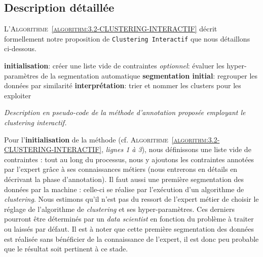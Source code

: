 	
	\subsection{Description détaillée}
	\label{section:3.2.2-DESCRIPTION-THEORIQUE-DETAILLEE}
	
		L'\textsc{Algorithme~\ref{algorithm:3.2-CLUSTERING-INTERACTIF}} décrit formellement notre proposition de \texttt{Clustering Interactif} que nous détaillons ci-dessous.
		\begin{algorithm}
			\textbf{initialisation}: créer une liste vide de contraintes \;
			\textit{optionnel}: évaluer les hyper-paramètres de la segmentation automatique \;
			\textbf{segmentation initial}: regrouper les données par similarité \;
			\textbf{interprétation}: trier et nommer les clusters pour les exploiter \;
			\caption{\textit{
				Description en pseudo-code de la méthode d'annotation proposée employant le \textit{clustering} interactif.
			}}
			\label{algorithm:3.2-CLUSTERING-INTERACTIF}
		\end{algorithm}
		
		Pour l'\textbf{initialisation} de la méthode (cf. \textsc{Algorithme~\ref{algorithm:3.2-CLUSTERING-INTERACTIF}}, \textit{lignes 1 à 3}), nous définissons une liste vide de contraintes : tout au long du processus, nous y ajoutons les contraintes annotées par l'expert grâce à ses connaissances métiers (nous entrerons en détails en décrivant la phase d'annotation).
		Il faut aussi une première segmentation des données par la machine : celle-ci se réalise par l'exécution d'un algorithme de \textit{clustering}.
		Nous estimons qu'il n'est pas du ressort de l'expert métier de choisir le réglage de l'algorithme de \textit{clustering} et ses hyper-paramètres.
		Ces derniers pourront être déterminés par un \textit{data scientist} en fonction du problème à traiter ou laissés par défaut.
		Il est à noter que cette première segmentation des données est réalisée sans bénéficier de la connaissance de l'expert, il est donc peu probable que le résultat soit pertinent à ce stade.
		
